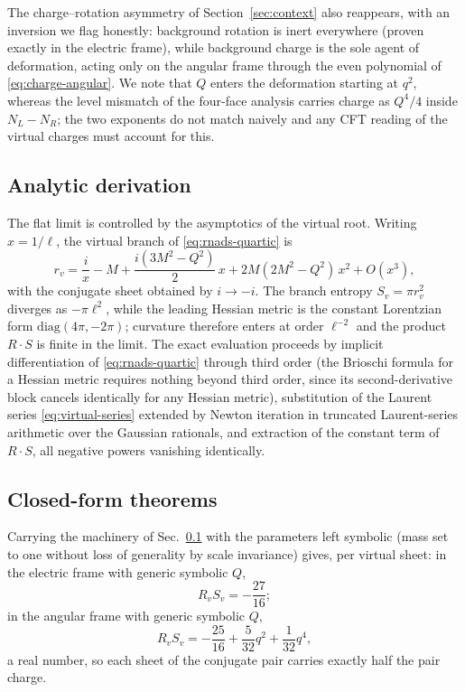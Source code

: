 The charge--rotation asymmetry of Section~\ref{sec:context} also reappears, with an inversion we flag honestly: background rotation is inert everywhere (proven exactly in the electric frame), while background charge is the sole agent of deformation, acting only on the angular frame through the even polynomial of \eqref{eq:charge-angular}. We note that $Q$ enters the deformation starting at $q^2$, whereas the level mismatch of the four-face analysis carries charge as $Q^4/4$ inside $N_L - N_R$; the two exponents do not match naively and any CFT reading of the virtual charges must account for this.

\subsection{Analytic derivation}
\label{ssec:analytic}

The flat limit is controlled by the asymptotics of the virtual root. Writing $x = 1/\ell$, the virtual branch of \eqref{eq:rnads-quartic} is
\begin{equation}
r_v = \frac{i}{x} - M + \frac{i(3M^2 - Q^2)}{2}\,x + 2M(2M^2 - Q^2)\,x^2 + O(x^3),
\label{eq:virtual-series}
\end{equation}
with the conjugate sheet obtained by $i \to -i$. The branch entropy $S_v = \pi r_v^2$ diverges as $-\pi\ell^2$, while the leading Hessian metric is the constant Lorentzian form $\mathrm{diag}(4\pi, -2\pi)$; curvature therefore enters at order $\ell^{-2}$ and the product $R\cdot S$ is finite in the limit. The exact evaluation proceeds by implicit differentiation of \eqref{eq:rnads-quartic} through third order (the Brioschi formula for a Hessian metric requires nothing beyond third order, since its second-derivative block cancels identically for any Hessian metric), substitution of the Laurent series \eqref{eq:virtual-series} extended by Newton iteration in truncated Laurent-series arithmetic over the Gaussian rationals, and extraction of the constant term of $R\cdot S$, all negative powers vanishing identically.

\subsection{Closed-form theorems}
\label{ssec:closedforms}

Carrying the machinery of Sec.~\ref{ssec:analytic} with the parameters left symbolic (mass set to one without loss of generality by scale invariance) gives, per virtual sheet: in the electric frame with generic symbolic $Q$,
\begin{equation}
R_v S_v = -\frac{27}{16};
\label{eq:persheet-electric}
\end{equation}
in the angular frame with generic symbolic $Q$,
\begin{equation}
R_v S_v = -\frac{25}{16} + \frac{5}{32}q^2 + \frac{1}{32}q^4,
\label{eq:persheet-angular}
\end{equation}
a real number, so each sheet of the conjugate pair carries exactly half the pair charge.

